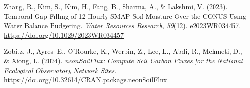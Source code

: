 \documentclass[
  letterpaper,
  DIV=11,
  numbers=noendperiod]{scrartcl}
\newlength{\cslhangindent}
\newenvironment{CSLReferences}[2] %
 {\begin{list}{}{%
  \setlength{\itemindent}{0pt}
  \setlength{\leftmargin}{0pt}
  \setlength{\parsep}{0pt}
  \ifodd #1
   \setlength{\leftmargin}{\cslhangindent}
   \setlength{\itemindent}{-1\cslhangindent}
  \fi
  \setlength{\itemsep}{#2\baselineskip}}}
 {\end{list}}
\begin{document}
\begin{CSLReferences}{1}{0}
Zhang, R., Kim, S., Kim, H., Fang, B., Sharma, A., \& Lakshmi, V.
(2023). Temporal {Gap-Filling} of 12-{Hourly SMAP Soil Moisture Over}
the {CONUS Using Water Balance Budgeting}. \emph{Water Resources
Research}, \emph{59}(12), e2023WR034457.
\url{https://doi.org/10.1029/2023WR034457}

Zobitz, J., Ayres, E., O'Rourke, K., Werbin, Z., Lee, L., Abdi, R.,
Mehmeti, D., \& Xiong, L. (2024). \emph{{neonSoilFlux}: {Compute Soil
Carbon Fluxes} for the {National Ecological Observatory Network Sites}}.
\url{https://doi.org/10.32614/CRAN.package.neonSoilFlux}

\end{CSLReferences}
\end{document}

